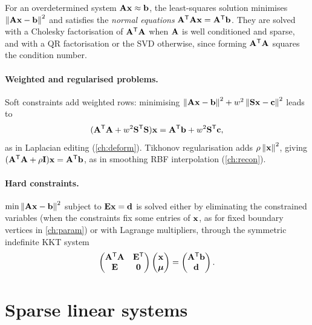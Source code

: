 For an overdetermined system $\mathbf{A}\mathbf{x}\approx\mathbf{b}$, the least-squares solution minimises
$\left\lVert \mathbf{A}\mathbf{x}-\mathbf{b}\right\rVert^2$ and satisfies the \emph{normal equations} $\mathbf{A}^{\mathsf{T}}\mathbf{A}\mathbf{x}=\mathbf{A}^{\mathsf{T}}\mathbf{b}$. They are
solved with a Cholesky factorisation of $\mathbf{A}^{\mathsf{T}}\mathbf{A}$ when $\mathbf{A}$ is well conditioned and sparse, and with a
QR factorisation or the SVD otherwise, since forming $\mathbf{A}^{\mathsf{T}}\mathbf{A}$ squares the condition number.

\paragraph{Weighted and regularised problems.} Soft constraints add weighted rows: minimising
$\left\lVert \mathbf{A}\mathbf{x}-\mathbf{b}\right\rVert^2+w^2\left\lVert \mathbf{S}\mathbf{x}-\mathbf{c}\right\rVert^2$ leads to
\begin{equation}
(\mathbf{A}^{\mathsf{T}}\mathbf{A}+w^2\mathbf{S}^{\mathsf{T}}\mathbf{S})\mathbf{x}=\mathbf{A}^{\mathsf{T}}\mathbf{b}+w^2\mathbf{S}^{\mathsf{T}}\mathbf{c} ,
\end{equation}
as in Laplacian editing (\cref{ch:deform}). Tikhonov regularisation adds $\rho\left\lVert \mathbf{x}\right\rVert^2$, giving
$(\mathbf{A}^{\mathsf{T}}\mathbf{A}+\rho\mathbf{I})\mathbf{x}=\mathbf{A}^{\mathsf{T}}\mathbf{b}$, as in smoothing RBF interpolation (\cref{ch:recon}).

\paragraph{Hard constraints.} $\min\left\lVert \mathbf{A}\mathbf{x}-\mathbf{b}\right\rVert^2$ subject to $\mathbf E\mathbf{x}=\mathbf{d}$ is solved either by
eliminating the constrained variables (when the constraints fix some entries of $\mathbf{x}$, as for fixed
boundary vertices in \cref{ch:param}) or with Lagrange multipliers, through the symmetric indefinite
KKT system
\begin{equation}
\begin{pmatrix}\mathbf{A}^{\mathsf{T}}\mathbf{A}&\mathbf E^{\mathsf{T}}\\\mathbf E&\mathbf{0}\end{pmatrix}\begin{pmatrix}\mathbf{x}\\\boldsymbol\mu\end{pmatrix}
=\begin{pmatrix}\mathbf{A}^{\mathsf{T}}\mathbf{b}\\\mathbf{d}\end{pmatrix} .
\end{equation}

\section{Sparse linear systems}

